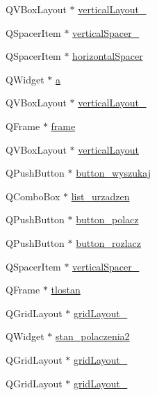 \begin{DoxyCompactItemize}
\item 
Q\+V\+Box\+Layout $\ast$ \hyperlink{class_ui___main_window_afcc20a3d5058037a00cdc6122f231848}{vertical\+Layout\+\_}
\item 
Q\+Spacer\+Item $\ast$ \hyperlink{class_ui___main_window_ac845bdf6b5b5237378a7b067808b7a31}{vertical\+Spacer\+\_}
\item 
Q\+Spacer\+Item $\ast$ \hyperlink{class_ui___main_window_a7871ea8c4b6c595d7ccd53960b344719}{horizontal\+Spacer}
\item 
Q\+Widget $\ast$ \hyperlink{class_ui___main_window_ab70b373357a746e70b5ef5b4814888b6}{a}
\item 
Q\+V\+Box\+Layout $\ast$ \hyperlink{class_ui___main_window_a0c01bad60d9f422a1258e710635a2f65}{vertical\+Layout\+\_}
\item 
Q\+Frame $\ast$ \hyperlink{class_ui___main_window_ad01968740c435709a8b2ec4c08094c67}{frame}
\item 
Q\+V\+Box\+Layout $\ast$ \hyperlink{class_ui___main_window_aecd96a04789fcfec3f98d80390ad8184}{vertical\+Layout}
\item 
Q\+Push\+Button $\ast$ \hyperlink{class_ui___main_window_ae1f5118fab998b948831cebc923325ca}{button\+\_\+wyszukaj}
\item 
Q\+Combo\+Box $\ast$ \hyperlink{class_ui___main_window_a1ec9d95ae78ce44c33e10f0dce73eedb}{list\+\_\+urzadzen}
\item 
Q\+Push\+Button $\ast$ \hyperlink{class_ui___main_window_a2b1221815978f1c67ebca29edc8431dc}{button\+\_\+polacz}
\item 
Q\+Push\+Button $\ast$ \hyperlink{class_ui___main_window_a53a3457cca90680d43cff2058a0f7455}{button\+\_\+rozlacz}
\item 
Q\+Spacer\+Item $\ast$ \hyperlink{class_ui___main_window_adc1f5fdd97fb3729999c56902d0fa591}{vertical\+Spacer\+\_}
\item 
Q\+Frame $\ast$ \hyperlink{class_ui___main_window_ab62918b998d8548c51456dfc3415f8bd}{tlostan}
\item 
Q\+Grid\+Layout $\ast$ \hyperlink{class_ui___main_window_a8731b71c513ff94baf59614807823c5d}{grid\+Layout\+\_}
\item 
Q\+Widget $\ast$ \hyperlink{class_ui___main_window_a10cb711ccdd4768a24e76e6a7bc39c22}{stan\+\_\+polaczenia2}
\item 
Q\+Grid\+Layout $\ast$ \hyperlink{class_ui___main_window_a3e3ee1a7d9c9d9d2004a5907306de885}{grid\+Layout\+\_}
\item 
Q\+Grid\+Layout $\ast$ \hyperlink{class_ui___main_window_a4fc0865a2fea446b284d1db5fc111211}{grid\+Layout\+\_}

\end{DoxyCompactItemize}
